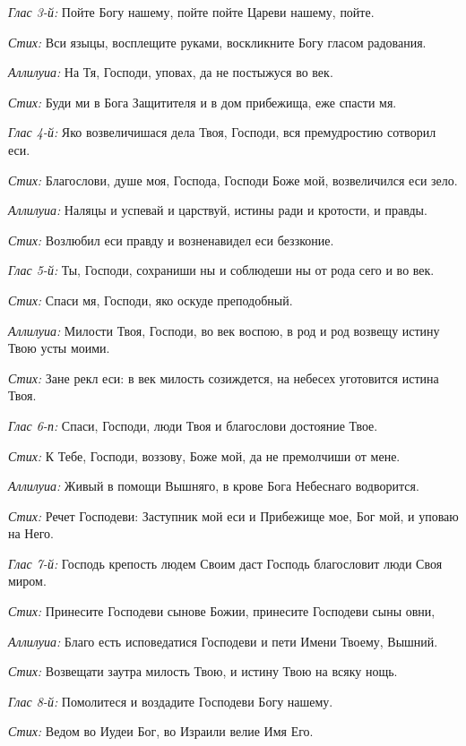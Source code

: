  {\itshape Глас 3-й:} Пойте Богу нашему, пойте пойте Цареви нашему, пойте.

 {\itshape Стих:} Вси языцы, восплещите руками, воскликните Богу гласом радования.

 {\itshape Аллилуиа:} На Тя, Господи, уповах, да не постыжуся во век.

 {\itshape Стих:} Буди ми в Бога Защитителя и в дом прибежища, еже спасти мя.

 {\itshape Глас 4-й:} Яко возвеличишася дела Твоя, Господи, вся премудростию сотворил еси.

 {\itshape Стих:} Благослови, душе моя, Господа, Господи Боже мой, возвеличился еси зело.

 {\itshape Аллилуиа:} Наляцы и успевай и царствуй, истины ради и кротости, и правды.

 {\itshape Стих:} Возлюбил еси правду и возненавидел еси беззконие.

 {\itshape Глас 5-й:} Ты, Господи, сохраниши ны и соблюдеши ны от рода сего и во век.

 {\itshape Стих:} Спаси мя, Господи, яко оскуде преподобный.

 {\itshape Аллилуиа:} Милости Твоя, Господи, во век воспою, в род и род возвещу истину Твою усты моими.

 {\itshape Стих:} Зане рекл еси: в век милость созиждется, на небесех уготовится истина Твоя.

 {\itshape Глас 6-п:} Спаси, Господи, люди Твоя и благослови достояние Твое.

 {\itshape Стих:} К Тебе, Господи, воззову, Боже мой, да не премолчиши от мене.

 {\itshape Аллилуиа:} Живый в помощи Вышняго, в крове Бога Небеснаго водворится.

 {\itshape Стих:} Речет Господеви: Заступник мой еси и Прибежище мое, Бог мой, и уповаю на Него.

 {\itshape Глас 7-й:} Господь крепость людем Своим даст Господь благословит люди Своя миром.

 {\itshape Стих:} Принесите Господеви сынове Божии, принесите Господеви сыны овни,

 {\itshape Аллилуиа:} Благо есть исповедатися Господеви и пети Имени Твоему, Вышний.

 {\itshape Стих:} Возвещати заутра милость Твою, и истину Твою на всяку нощь.

 {\itshape Глас 8-й:} Помолитеся и воздадите Господеви Богу нашему.

 {\itshape Стих:} Ведом во Иудеи Бог, во Израили велие Имя Его.

